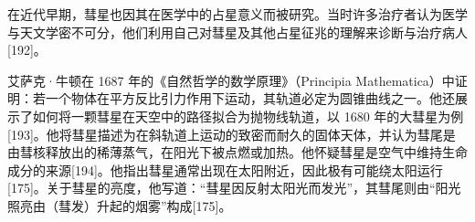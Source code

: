 在近代早期，彗星也因其在医学中的占星意义而被研究。当时许多治疗者认为医学与天文学密不可分，他们利用自己对彗星及其他占星征兆的理解来诊断与治疗病人[192]。

艾萨克·牛顿在 1687 年的《自然哲学的数学原理》（Principia Mathematica）中证明：若一个物体在平方反比引力作用下运动，其轨道必定为圆锥曲线之一。他还展示了如何将一颗彗星在天空中的路径拟合为抛物线轨道，以 1680 年的大彗星为例[193]。他将彗星描述为在斜轨道上运动的致密而耐久的固体天体，并认为彗尾是由彗核释放出的稀薄蒸气，在阳光下被点燃或加热。他怀疑彗星是空气中维持生命成分的来源[194]。他指出彗星通常出现在太阳附近，因此极有可能绕太阳运行[175]。关于彗星的亮度，他写道：“彗星因反射太阳光而发光”，其彗尾则由“阳光照亮由（彗发）升起的烟雾”构成[175]。



